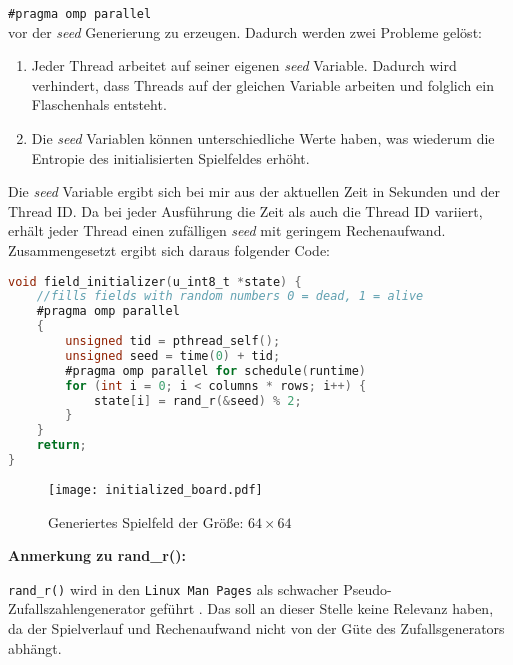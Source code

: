 \documentclass[german,plainarticle,hyperref,utf8]{zihpub}
\begin{document}
	\texttt{\#pragma omp parallel}\\
	
	vor der \textit{seed} Generierung zu erzeugen. Dadurch werden zwei Probleme gelöst:
	\begin{enumerate}
		\item Jeder Thread arbeitet auf seiner eigenen \textit{seed} Variable. Dadurch wird verhindert, dass Threads auf der gleichen Variable arbeiten und folglich ein Flaschenhals entsteht.
		\item Die \textit{seed} Variablen können unterschiedliche Werte haben, was wiederum die Entropie des initialisierten Spielfeldes erhöht.
	\end{enumerate}
	
	Die \textit{seed} Variable ergibt sich bei mir aus der aktuellen Zeit in Sekunden und der Thread ID. Da bei jeder Ausführung die Zeit als auch die Thread ID variiert, erhält jeder Thread einen zufälligen \textit{seed} mit geringem Rechenaufwand.\\
	
	Zusammengesetzt ergibt sich daraus folgender Code:\\
	
	\begin{lstlisting}[language=C, caption=Daten Initialisierung]
void field_initializer(u_int8_t *state) {
	//fills fields with random numbers 0 = dead, 1 = alive
	#pragma omp parallel
	{
		unsigned tid = pthread_self();
		unsigned seed = time(0) + tid;
		#pragma omp parallel for schedule(runtime)
		for (int i = 0; i < columns * rows; i++) {
			state[i] = rand_r(&seed) % 2;
		}
	}
	return;
}\end{lstlisting}
	\begin{figure}[h]
		\begin{center}
			\texttt{[image: initialized\_board.pdf]}
		\end{center}
		\caption{Generiertes Spielfeld der Größe: $64\times 64$}
	\end{figure}
	\newpage
	\textbf{Anmerkung zu rand\_r():}
	
	\texttt{rand\_r()} wird in den \texttt{Linux Man Pages} als schwacher Pseudo-Zufallszahlengenerator geführt \cite{lmp}. Das soll an dieser Stelle keine Relevanz haben, da der Spielverlauf und Rechenaufwand nicht von der Güte des Zufallsgenerators abhängt.
	
\end{document}
